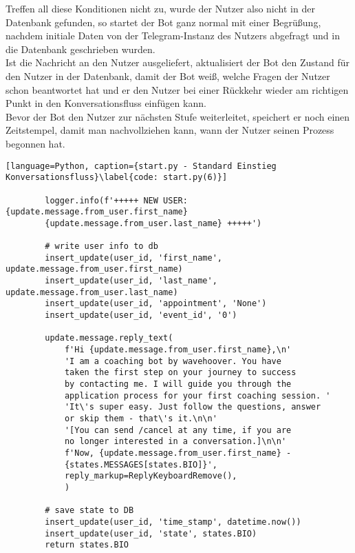            Treffen all diese Konditionen nicht zu, wurde der Nutzer also nicht in der Datenbank gefunden, so startet der Bot ganz normal mit einer Begrüßung, nachdem initiale Daten von der Telegram-Instanz des Nutzers abgefragt und in die Datenbank geschrieben wurden. \\
            Ist die Nachricht an den Nutzer ausgeliefert, aktualisiert der Bot den Zustand für den Nutzer in der Datenbank, damit der Bot weiß, welche Fragen der Nutzer schon beantwortet hat und er den Nutzer bei einer Rückkehr wieder am richtigen Punkt in den Konversationsfluss einfügen kann.\\
            Bevor der Bot den Nutzer zur nächsten Stufe weiterleitet, speichert er noch einen Zeitstempel, damit man nachvollziehen kann, wann der Nutzer seinen Prozess begonnen hat.
            \begin{lstlisting}[language=Python, caption={start.py - Standard Einstieg Konversationsfluss}\label{code: start.py(6)}]

        logger.info(f'+++++ NEW USER: {update.message.from_user.first_name} 
        {update.message.from_user.last_name} +++++')

        # write user info to db
        insert_update(user_id, 'first_name', update.message.from_user.first_name) 
        insert_update(user_id, 'last_name', update.message.from_user.last_name)
        insert_update(user_id, 'appointment', 'None')
        insert_update(user_id, 'event_id', '0')

        update.message.reply_text(
            f'Hi {update.message.from_user.first_name},\n'
            'I am a coaching bot by wavehoover. You have 
            taken the first step on your journey to success 
            by contacting me. I will guide you through the 
            application process for your first coaching session. '
            'It\'s super easy. Just follow the questions, answer 
            or skip them - that\'s it.\n\n'
            '[You can send /cancel at any time, if you are 
            no longer interested in a conversation.]\n\n'
            f'Now, {update.message.from_user.first_name} - 
            {states.MESSAGES[states.BIO]}',
            reply_markup=ReplyKeyboardRemove(),
            )

        # save state to DB
        insert_update(user_id, 'time_stamp', datetime.now())
        insert_update(user_id, 'state', states.BIO)
        return states.BIO
            \end{lstlisting}

